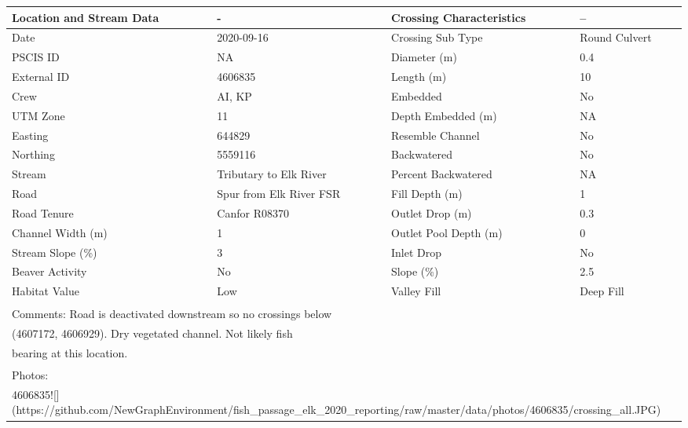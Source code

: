 \documentclass[
]{book}
\begin{document}
\begin{tabular}{l|l|l|l}
\hline
Location and Stream Data & - & Crossing Characteristics & --\\
\hline
Date & 2020-09-16 & Crossing Sub Type & Round Culvert\\
\hline
PSCIS ID & NA & Diameter (m) & 0.4\\
\hline
External ID & 4606835 & Length (m) & 10\\
\hline
Crew & AI, KP & Embedded & No\\
\hline
UTM Zone & 11 & Depth Embedded (m) & NA\\
\hline
Easting & 644829 & Resemble Channel & No\\
\hline
Northing & 5559116 & Backwatered & No\\
\hline
Stream & Tributary to Elk River & Percent Backwatered & NA\\
\hline
Road & Spur from Elk River FSR & Fill Depth (m) & 1\\
\hline
Road Tenure & Canfor R08370 & Outlet Drop (m) & 0.3\\
\hline
Channel Width (m) & 1 & Outlet Pool Depth (m) & 0\\
\hline
Stream Slope (\%) & 3 & Inlet Drop & No\\
\hline
Beaver Activity & No & Slope (\%) & 2.5\\
\hline
Habitat Value & Low & Valley Fill & Deep Fill\\
\hline
\multicolumn{4}{l}{\textsuperscript{} Comments: Road is deactivated downstream so no crossings below}\\
\multicolumn{4}{l}{(4607172, 4606929). Dry vegetated channel. Not likely fish}\\
\multicolumn{4}{l}{bearing at this location.}\\
\multicolumn{4}{l}{\textsuperscript{} Photos:}\\
\multicolumn{4}{l}{4606835![](https://github.com/NewGraphEnvironment/fish\_passage\_elk\_2020\_reporting/raw/master/data/photos/4606835/crossing\_all.JPG)}\\
\end{tabular}
\end{document}

